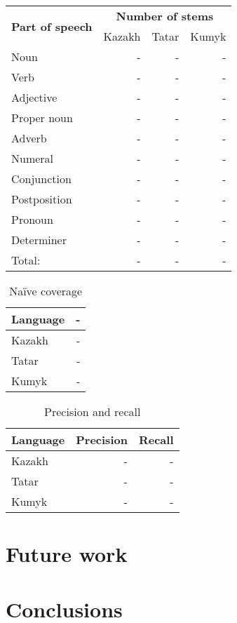 \documentclass{article}
\begin{document}
\begin{table}
\begin{center}
\begin{tabular}{lrrr}
		\hline
\multirow{2}{*}{\textbf{Part of speech}} & \multicolumn{3}{|c|}{\textbf{Number of stems}} \\
                        & Kazakh & Tatar & Kumyk \\
		\hline
		Noun & - & - & - \\
		Verb & - & - & - \\
		Adjective & - & - & - \\
		Proper noun & - & - & - \\
		Adverb & - & - & - \\
		Numeral & - & - & - \\
		Conjunction & - & - & - \\
		Postposition & - & - & - \\
		Pronoun & - & - & - \\
		Determiner & - & - & - \\
		\hline
		Total: & - & - & - \\
		\hline
\end{tabular}
\end{center}

\end{table}

\begin{table}
\begin{center}
\begin{tabular}{lr}
\textbf{Language} & - \\
\hline
Kazakh & - \\
Tatar & - \\
Kumyk & - \\
\hline
\end{tabular}
 \caption{Naïve coverage}
 \label{table:coverage}
\end{center}
\end{table}

\begin{table}
\begin{center}
\begin{tabular}{lrr}
\textbf{Language} & \textbf{Precision} & \textbf{Recall} \\
\hline
Kazakh & - &  - \\
Tatar & - & - \\
Kumyk & - & - \\
\hline
\end{tabular}
 \caption{Precision and recall}
 \label{table:coverage}
\end{center}
\end{table}




\section{Future work}


\section{Conclusions}





\end{document}
